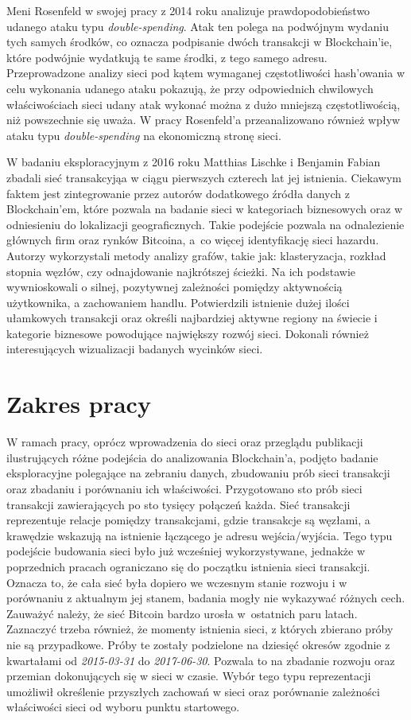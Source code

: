 \documentclass[12pt, twoside, final, openany]{mgr}
\begin{document}
\indent Meni Rosenfeld\cite{Rosenfeld2014} w swojej pracy z 2014 roku analizuje prawdopodobieństwo udanego ataku typu \textit{double-spending}. Atak ten polega na podwójnym wydaniu tych samych środków, co oznacza podpisanie dwóch transakcji w Blockchain'ie, które podwójnie wydatkują te same środki, z tego samego adresu. Przeprowadzone analizy sieci pod kątem wymaganej częstotliwości hash'owania w celu wykonania udanego ataku pokazują, że przy odpowiednich chwilowych właściwościach sieci udany atak wykonać można z dużo mniejszą częstotliwością, niż powszechnie się uważa. W pracy  Rosenfeld'a przeanalizowano również wpływ ataku typu \textit{double-spending} na ekonomiczną stronę sieci.

\indent W badaniu eksploracyjnym z 2016 roku Matthias Lischke i Benjamin Fabian\cite{Lischke2016} zbadali sieć transakcyjąa w ciągu pierwszych czterech lat jej istnienia. Ciekawym faktem jest zintegrowanie przez autorów dodatkowego źródła danych z Blockchain'em, które pozwala na badanie sieci w kategoriach biznesowych oraz w odniesieniu do lokalizacji geograficznych. Takie podejście pozwala na odnalezienie głównych firm oraz rynków Bitcoina, a~co więcej identyfikację sieci hazardu. Autorzy wykorzystali metody analizy grafów, takie jak: klasteryzacja, rozkład stopnia węzłów, czy odnajdowanie najkrótszej ścieżki. Na ich podstawie wywnioskowali o silnej, pozytywnej zależności pomiędzy aktywnością użytkownika, a zachowaniem handlu. Potwierdzili istnienie dużej ilości ułamkowych transakcji oraz określi najbardziej aktywne regiony na świecie i kategorie biznesowe powodujące największy rozwój sieci. Dokonali również interesujących wizualizacji badanych wycinków sieci.
\newpage

\section{Zakres pracy}

\indent W ramach pracy, oprócz wprowadzenia do sieci oraz przeglądu publikacji ilustrujących różne podejścia do analizowania Blockchain'a, podjęto badanie eksploracyjne polegające na zebraniu danych, zbudowaniu prób sieci transakcji oraz zbadaniu i porównaniu ich właściwości. Przygotowano sto prób sieci transakcji zawierających po sto tysięcy połączeń każda. Sieć transakcji reprezentuje relacje pomiędzy transakcjami, gdzie transakcje są węzłami, a krawędzie wskazują na istnienie łączącego je adresu wejścia/wyjścia. Tego typu podejście budowania sieci było już wcześniej wykorzystywane, jednakże w poprzednich pracach ograniczano się do początku istnienia sieci transakcji. Oznacza to, że cała sieć była dopiero we wczesnym stanie rozwoju i w porównaniu z aktualnym jej stanem, badania mogły nie wykazywać różnych cech. Zauważyć należy, że sieć Bitcoin bardzo urosła w~ostatnich paru latach. Zaznaczyć trzeba również, że momenty istnienia sieci, z których zbierano próby nie są przypadkowe. Próby te zostały podzielone na dziesięć okresów zgodnie z kwartałami od \textit{2015-03-31} do \textit{2017-06-30}. Pozwala to na zbadanie rozwoju oraz przemian dokonujących się w sieci w czasie. Wybór tego typu reprezentacji umożliwił określenie przyszłych zachowań w sieci oraz porównanie zależności właściwości sieci od wyboru punktu startowego.
\end{document}
